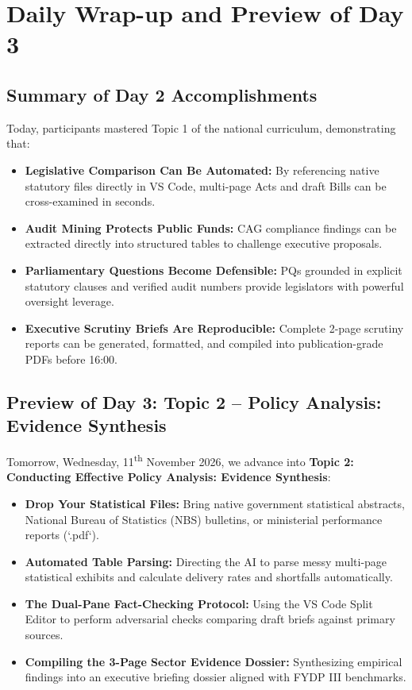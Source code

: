 \documentclass[11pt, a4paper]{report}
\begin{document}
\newpage

\chapter{Daily Wrap-up and Preview of Day 3}

\section{Summary of Day 2 Accomplishments}
Today, participants mastered Topic 1 of the national curriculum, demonstrating that:
\begin{itemize}[label=-]
    \item \textbf{Legislative Comparison Can Be Automated:} By referencing native statutory files directly in VS Code, multi-page Acts and draft Bills can be cross-examined in seconds.
    \item \textbf{Audit Mining Protects Public Funds:} CAG compliance findings can be extracted directly into structured tables to challenge executive proposals.
    \item \textbf{Parliamentary Questions Become Defensible:} PQs grounded in explicit statutory clauses and verified audit numbers provide legislators with powerful oversight leverage.
    \item \textbf{Executive Scrutiny Briefs Are Reproducible:} Complete 2-page scrutiny reports can be generated, formatted, and compiled into publication-grade PDFs before 16:00.
\end{itemize}

\section{Preview of Day 3: Topic 2 -- Policy Analysis: Evidence Synthesis}
Tomorrow, Wednesday, 11\textsuperscript{th} November 2026, we advance into \textcolor{suagreen}{\textbf{Topic 2: Conducting Effective Policy Analysis: Evidence Synthesis}}:
\begin{itemize}[label=-]
    \item \textbf{Drop Your Statistical Files:} Bring native government statistical abstracts, National Bureau of Statistics (NBS) bulletins, or ministerial performance reports (`.pdf`).
    \item \textbf{Automated Table Parsing:} Directing the AI to parse messy multi-page statistical exhibits and calculate delivery rates and shortfalls automatically.
    \item \textbf{The Dual-Pane Fact-Checking Protocol:} Using the VS Code Split Editor to perform adversarial checks comparing draft briefs against primary sources.
    \item \textbf{Compiling the 3-Page Sector Evidence Dossier:} Synthesizing empirical findings into an executive briefing dossier aligned with FYDP III benchmarks.
\end{itemize}
\end{document}
